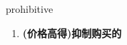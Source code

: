 
\begin{frame}
{\huge prohibitive}
\begin{center}
\begin{enumerate}\Large
  \item \textbf{(价格高得)抑制购买的}
\end{enumerate}
\end{center}
\end{frame}
